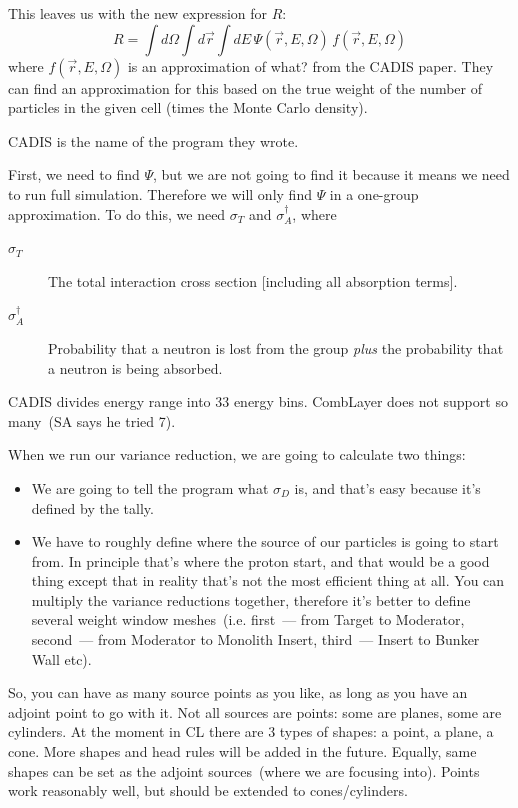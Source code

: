 This leaves us with the new expression for $R$:
\begin{equation}
  \label{eq:vr:R1}
  R = \int d\Omega \int d\vec{r} \int dE \, \Psi(\vec{r},E,\Omega) \, f(\vec{r},E,\Omega)
\end{equation}
where $f(\vec{r},E,\Omega)$ is an approximation \alert{of what?} from the CADIS paper. 
They can find an approximation for this based on the true weight of the number of particles in the given cell
(times the Monte Carlo density).

CADIS is the name of the program they wrote.

First, we need to find $\Psi$, but we are not going to find it because it means we need to run full simulation.
Therefore we will only find $\Psi$ in a one-group approximation.
To do this, we need $\sigma_{T}$ and $\sigma_{A}^\dagger$, where

\begin{description}
\item[$\sigma_{T}$] The total interaction cross section [including all absorption terms].
\item[$\sigma_{A}^\dagger$] Probability that a neutron is lost from the group {\em plus} the probability that a neutron is being absorbed.
\end{description}

CADIS divides energy range into 33 energy bins. CombLayer does not support so many~(SA says he tried 7).

\bigskip

When we run our variance reduction, we are going to calculate two things:
\begin{itemize}
\item We are going to tell the program what $\sigma_D$ is, and that's easy because it's defined by the tally.
\item We have to roughly define where the source of our particles is going to start from. In principle that's where the proton start,
  and that would be a good thing except that in reality that's not the most efficient thing at all.
  You can multiply the variance reductions together, therefore it's better to define several weight window meshes~(i.e.
  first~--- from Target to Moderator, second~--- from Moderator to Monolith Insert, third~--- Insert to Bunker Wall etc).
\end{itemize}

So, you can have as many source points as you like, as long as you have an adjoint point to go with it.
Not all sources are points: some are planes, some are cylinders. At the moment in CL there are 3 types of shapes: a point, a plane, a cone.
More shapes and head rules will be added in the future.
Equally, same shapes can be set as the adjoint sources~(where we are focusing into).
Points work reasonably well, but should be extended to cones/cylinders.

